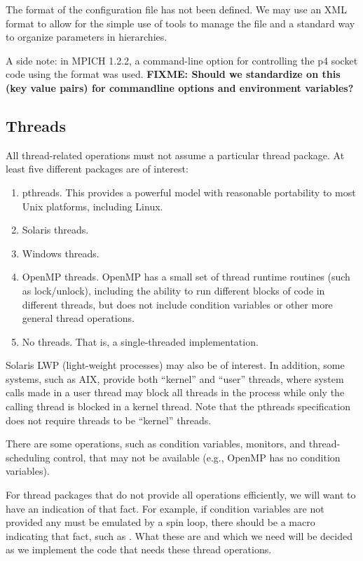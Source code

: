\documentclass{article}
\def\fixme#1{\marginpar{FIXME:}\textbf{FIXME: #1}}
\begin{document}
The format of the configuration file has not been defined.  We may use
an XML format to allow for the simple use of tools to manage the file and
a standard way to organize parameters in hierarchies.

A side note: in MPICH 1.2.2, a command-line option for controlling the
p4 socket code using the format 
was used.  \fixme{Should we standardize on this (key \code{=} value pairs)
for commandline options and environment variables?}

\subsection{Threads}
\label{sec:threads}
All thread-related operations must not assume a particular thread
package.  At least five different packages are of interest:
\begin{enumerate}
\item pthreads.  This provides a powerful model with reasonable
portability to most Unix platforms, including Linux.  

\item Solaris threads.

\item Windows threads.  

\item OpenMP threads.  OpenMP has a small set of thread runtime
routines (such as lock/unlock), including the ability to run different blocks
of code in different threads, but does not include condition variables
or other more general thread operations.

\item No threads.  That is, a single-threaded implementation.  
\end{enumerate}
Solaris LWP (light-weight processes) may also be of interest.  In
addition, some systems, such as AIX, provide both ``kernel'' and
``user'' threads, where system calls made in a user thread may block
all threads in the process while only the calling thread is blocked in
a kernel thread.  Note that the pthreads specification does not
require threads to be ``kernel'' threads. 

There are some operations, such as condition variables, monitors, and
thread-scheduling control, that may not be available (e.g., OpenMP
has no condition variables).  

For thread packages that do not provide all operations efficiently, we
will want to have an indication of that fact.  For example, if
condition variables are not provided any must be emulated by a spin
loop, there should be a macro indicating that fact, such as
.  What these are and which we need
will be decided as we implement the code that needs these thread
operations.
\end{document}
